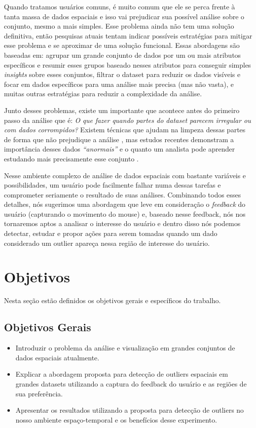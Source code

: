 Quando tratamos usuários comuns, é muito comum que ele se perca frente à tanta massa de dados espaciais e isso vai prejudicar sua possível análise sobre o conjunto, mesmo a mais simples. Esse problema ainda não tem uma solução definitiva, então pesquisas atuais tentam indicar possíveis estratégias para mitigar esse problema e se aproximar de uma solução funcional. Essas abordagens são baseadas em: agrupar um grande conjunto de dados por um ou mais atributos específicos e resumir esses grupos baseado nesses atributos para conseguir simples \textit{insights} sobre esses conjuntos, filtrar o dataset para reduzir os dados visíveis e focar em dados específicos para uma análise mais precisa (mas não vasta), e muitas outras estratégias para reduzir a complexidade da análise.

Junto desses problemas, existe um importante que acontece antes do primeiro passo da análise que é: \textit{O que fazer quando partes do dataset parecem irregular ou com dados corrompidos?} Existem técnicas que ajudam na limpeza dessas partes de forma que não prejudique a análise \cite{10.1007/978-3-319-11116-2_2}, mas estudos recentes demonstram a importância desses dados \textit{``anormais''} e o quanto um analista pode aprender estudando mais precisamente esse conjunto \cite{DBLP:journals/debu/FreireCVZ16}.

Nesse ambiente complexo de análise de dados espaciais com bastante variáveis e possibilidades, um usuário pode facilmente falhar numa dessas tarefas e comprometer seriamente o resultado de suas análises. Combinando todos esses detalhes, nós sugerimos uma abordagem que leve em consideração o \textit{feedback} do usuário (capturando o movimento do mouse) e, baseado nesse feedback, nós nos tornaremos aptos a analisar o interesse do usuário e dentro disso nós podemos detectar, estudar e propor ações para serem tomadas quando um dado considerado um outlier apareça nessa região de interesse do usuário.

\section{Objetivos}

Nesta seção estão definidos os objetivos gerais e específicos do trabalho.

\subsection{Objetivos Gerais}

\begin{itemize}
	\item
	      Introduzir o problema da análise e visualização em grandes conjuntos de dados espaciais atualmente.
	\item
	      Explicar a abordagem proposta para detecção de outliers espaciais em grandes datasets utilizando a captura do feedback do usuário e as regiões de sua preferência.
	\item
	      Apresentar os resultados utilizando a proposta para detecção de outliers no nosso ambiente espaço-temporal e os benefícios desse experimento.

\end{itemize}

